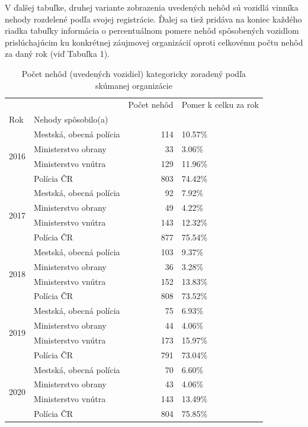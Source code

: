 \documentclass{article}
\begin{document}
\pagebreak

V ďalšej tabuľke, druhej variante zobrazenia uvedených nehôd sú vozidlá vinníka nehody
rozdelené podľa svojej registrácie.
Ďalej sa tiež pridáva na koniec každého riadka tabuľky informácia o percentuálnom pomere nehôd spôsobených vozidlom
prislúchajúcim ku konkrétnej záujmovej organizácií oproti celkovému počtu nehôd za daný rok (viď Tabuľka 1).

\begin{table}[htb]
\caption{Počet nehôd (uvedených vozidiel) kategoricky zoradený podľa skúmanej organizácie}
\begin{center}
\begin{tabular}{llrl}
\toprule
 &  & Počet nehôd & Pomer k celku za rok \\
Rok & Nehody spôsobilo(a) &  &  \\
\midrule
\multirow[t]{4}{*}{2016} & Mestská, obecná polícia & 114 & 10.57\% \\
 & Ministerstvo obrany & 33 & 3.06\% \\
 & Ministerstvo vnútra & 129 & 11.96\% \\
 & Polícia ČR & 803 & 74.42\% \\
\cline{1-4}
\multirow[t]{4}{*}{2017} & Mestská, obecná polícia & 92 & 7.92\% \\
 & Ministerstvo obrany & 49 & 4.22\% \\
 & Ministerstvo vnútra & 143 & 12.32\% \\
 & Polícia ČR & 877 & 75.54\% \\
\cline{1-4}
\multirow[t]{4}{*}{2018} & Mestská, obecná polícia & 103 & 9.37\% \\
 & Ministerstvo obrany & 36 & 3.28\% \\
 & Ministerstvo vnútra & 152 & 13.83\% \\
 & Polícia ČR & 808 & 73.52\% \\
\cline{1-4}
\multirow[t]{4}{*}{2019} & Mestská, obecná polícia & 75 & 6.93\% \\
 & Ministerstvo obrany & 44 & 4.06\% \\
 & Ministerstvo vnútra & 173 & 15.97\% \\
 & Polícia ČR & 791 & 73.04\% \\
\cline{1-4}
\multirow[t]{4}{*}{2020} & Mestská, obecná polícia & 70 & 6.60\% \\
 & Ministerstvo obrany & 43 & 4.06\% \\
 & Ministerstvo vnútra & 143 & 13.49\% \\
 & Polícia ČR & 804 & 75.85\% \\

\end{tabular}
\end{center}
\end{table}
\end{document}
